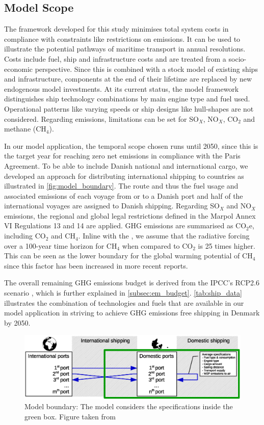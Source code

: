 \documentclass[article]{elsarticle}
\begin{document}
\subsection{Model Scope}
\label{subsec:Scope}
The framework developed for this study minimises total system costs in compliance with constraints like restrictions on emissions. It can be used to illustrate the potential pathways of maritime transport in annual resolutions. Costs include fuel, ship and infrastructure costs and are treated from a socio-economic perspective. Since this is combined with a stock model of existing ships and infrastructure, components at the end of their lifetime are replaced by new endogenous model investments. At its current status, the model framework distinguishes ship technology combinations by main engine type and fuel used. Operational patterns like varying speeds or ship designs like hull-shapes are not considered.
Regarding emissions, limitations can be set for SO$_X$, NO$_X$, CO$_2$ and methane (CH$_4$).

In our model application, the temporal scope chosen runs until 2050, since this is the target year for reaching zero net emissions in compliance with the Paris Agreement. To be able to include Danish national and international cargo, we developed an approach for distributing international shipping to countries as illustrated in \autoref{fig:model_boundary}. The route and thus the fuel usage and associated emissions of each voyage from or to a Danish port and half of the international voyages are assigned to Danish shipping. Regarding SO$_X$ and NO$_X$ emissions, the regional and global legal restrictions defined in the Marpol Annex VI Regulations 13 and 14 \cite{IMO2008a,IMO2008b} are applied. GHG emissions are summarised as CO$_2$e, including CO$_2$ and CH$_4$. Inline with the \citet{IPCC2007}, we assume that the radiative forcing over a 100-year time horizon for CH$_4$ when compared to CO$_2$ is 25 times higher. This can be seen as the lower boundary for the global warming potential of CH$_4$ since this factor has been increased in more recent reports.

The overall remaining GHG emissions budget is derived from the IPCC's RCP2.6 scenario \cite[p.~27]{IPCC2013}, which is further explained in \autoref{subsec:em_budget}. \autoref{tab:ship_data} illustrates the combination of technologies and fuels that are available in our model application in striving to achieve GHG emissions free shipping in Denmark by 2050.

\begin{figure}[htb]
    \centering
    \includegraphics[width=\textwidth]{figures/model_boundary_paper.eps}
    \caption{Model boundary: The model considers the specifications inside the green box. Figure taken from \cite{Thesis2018}}
    \label{fig:model_boundary}
\end{figure}
\end{document}
